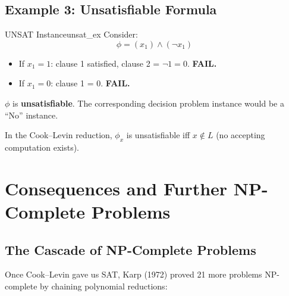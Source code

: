 \documentclass[12pt,a4paper]{article}
\begin{document}
\subsection{Example 3: Unsatisfiable Formula}

\begin{example}{UNSAT Instance}{unsat_ex}
Consider:
\[
  \phi = (x_1) \land (\neg x_1)
\]
\begin{itemize}[leftmargin=2em]
  \item If $x_1 = 1$: clause 1 satisfied, clause 2 = $\neg 1 = 0$. \textbf{FAIL.}
  \item If $x_1 = 0$: clause 1 = $0$. \textbf{FAIL.}
\end{itemize}
$\phi$ is \textbf{unsatisfiable}. The corresponding decision problem instance would be a ``No'' instance.

\medskip
In the Cook--Levin reduction, $\phi_x$ is unsatisfiable iff $x \notin L$ (no accepting computation exists).
\end{example}

\newpage

\section{Consequences and Further NP-Complete Problems}

\subsection{The Cascade of NP-Complete Problems}

Once Cook--Levin gave us SAT, Karp (1972) proved 21 more problems NP-complete 
by chaining polynomial reductions:
\end{document}
